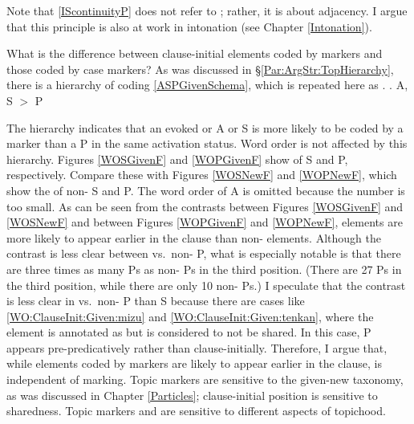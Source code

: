 Note that \ref{IScontinuityP} does not refer to ;
rather, it is about adjacency.
I argue that this principle is also at work in intonation (see Chapter \ref{Intonation}).

What is the difference between clause-initial elements coded by  markers and those coded by case markers?
As was discussed in \S \ref{Par:ArgStr:TopHierarchy},
there is a hierarchy of  coding \ref{ASPGivenSchema},
which is repeated here as \Next.
%
\ex.
 A, S $>$ P

The hierarchy indicates that an
evoked or  A or S is more likely to be coded by a  marker than a P in the same activation status.
Word order is not affected by this hierarchy.
Figures \ref{WOSGivenF} and \ref{WOPGivenF} show  of
 S and P, respectively.
Compare these with Figures \ref{WOSNewF} and \ref{WOPNewF},
which show the  of non- S and P.
The word order of A is omitted because the number is too small.
As can be seen from the contrasts between Figures \ref{WOSGivenF} and \ref{WOSNewF} and between Figures \ref{WOPGivenF} and \ref{WOPNewF},
 elements are more likely to appear earlier in the clause than non- elements.
Although the contrast is less clear between  vs.~non- P,
what is especially notable is that there are three times as many  Ps as non- Ps in the third position.
(There are 27  Ps in the third position,
while there are only 10 non- Ps.)
I speculate that the contrast is less clear in  vs.~non- P than S because there are cases like \ref{WO:ClauseInit:Given:mizu} and \ref{WO:ClauseInit:Given:tenkan},
where the element is annotated as  but is considered to not be shared.
In this case, P appears pre-predicatively rather than clause-initially.
Therefore, I argue that,
while elements coded by  markers are likely to appear earlier in the clause,
 is independent of  marking.
Topic markers are sensitive to the given-new taxonomy, as was discussed in Chapter \ref{Particles};
clause-initial position is sensitive to sharedness.
Topic markers and  are sensitive to different aspects of topichood.


